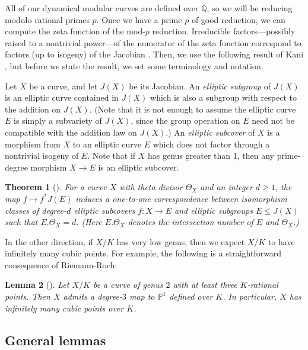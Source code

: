 \documentclass[12pt]{amsart}
\newtheorem{thm}{Theorem}[section]
\newtheorem{lem}[thm]{Lemma}
\theoremstyle{definition}
\newcommand{\bbP}{\mathbb{P}}
\newcommand{\bbQ}{\mathbb{Q}}
\numberwithin{equation}{section}
\begin{document}
All of our dynamical modular curves are defined over $\bbQ$, so we will be reducing modulo rational primes $p$. Once we have a prime $p$ of good reduction, we can compute the zeta function of the mod-$p$ reduction. Irreducible factors---possibly raised to a nontrivial power---of the numerator of the zeta function correspond to factors (up to isogeny) of the Jacobian \cite[Theorem 1]{tate:1966}. Then, we use the following result of Kani \cite{kani:1994}, but before we state the result, we set some terminology and notation.

Let $X$ be a curve, and let $J(X)$ be its Jacobian. An \textit{elliptic subgroup} of $J(X)$ is an elliptic curve contained in $J(X)$ which is also a subgroup with respect to the addition on $J(X)$. (Note that it is not enough to assume the elliptic curve $E$ is simply a subvariety of $J(X)$, since the group operation on $E$ need not be compatible with the addition law on $J(X)$.) An \emph{elliptic subcover} of $X$ is a morphism from $X$ to an elliptic curve $E$ which does not factor through a nontrivial isogeny of $E$. Note that if $X$ has genus greater than $1$, then any prime-degree morphism $X \to E$ is an elliptic subcover.

\begin{thm}[{\cite[Corollary 4.3]{kani:1994}}]\label{thm: kani elliptic subgroups}
    For a curve $X$ with theta divisor $\Theta_X$ and an integer $d \ge 1$, the map $f \mapsto f^*J(E)$ induces a one-to-one correspondence between isomorphism classes of degree-$d$ elliptic subcovers $f: X \to E$ and elliptic subgroups $E \leq J(X)$ such that $E.\Theta_X = d$. (Here $E.\Theta_X$ denotes the intersection number of $E$ and $\Theta_X$.)
\end{thm}

In the other direction, if $X/K$ has very low genus, then we expect $X/K$ to have infinitely many cubic points. For example, the following is a straightforward consequence of Riemann-Roch:

\begin{lem}[{\cite[Lemma 2.1]{jeon/kim/schweizer:2004}}]\label{lem:JKS_genus2}
    Let $X/K$ be a curve of genus $2$ with at least three $K$-rational points. Then $X$ admits a degree-$3$ map to $\bbP^1$ defined over $K$. In particular, $X$ has infinitely many cubic points over $K$.
\end{lem}

\subsection{General lemmas}\label{sec:general-lemmas}
\end{document}

